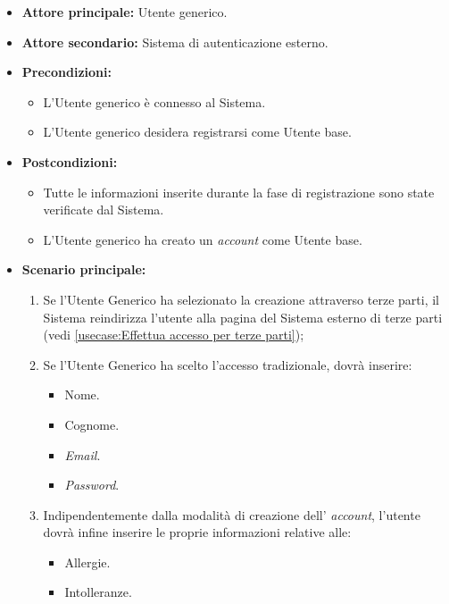 \label{usecase:Effettua registrazione Utente base}
\begin{itemize}

	\item \textbf{Attore principale:} Utente generico.
	\item \textbf{Attore secondario:} Sistema di autenticazione esterno.

	\item \textbf{Precondizioni:} 
	\begin{itemize}
        \item  L'Utente generico è connesso al Sistema.
        \item  L'Utente generico desidera registrarsi come Utente base.
    \end{itemize}
    
	\item \textbf{Postcondizioni:} 
    \begin{itemize}
        \item  Tutte le informazioni inserite durante la fase di registrazione sono state verificate dal Sistema.
        \item  L'Utente generico ha creato un \textit{account} come Utente base.
    \end{itemize}

	\item \textbf{Scenario principale:}
	\begin{enumerate}

            \item Se l'Utente Generico ha selezionato la creazione attraverso terze parti, il Sistema reindirizza l'utente alla pagina del Sistema esterno di terze parti (vedi \autoref{usecase:Effettua accesso per terze parti});
            \item Se l'Utente Generico ha scelto l'accesso tradizionale, dovrà inserire:
            \begin{itemize}
                \item Nome.
                \item Cognome.
                \item \textit{Email}.
                \item \textit{Password}.
            \end{itemize}
            \item Indipendentemente dalla modalità di creazione dell' \textit{account}, l'utente dovrà infine inserire le proprie informazioni relative alle:
            \begin{itemize}
                \item Allergie.
                \item Intolleranze.
            \end{itemize} 
	\end{enumerate}
\end{itemize}
